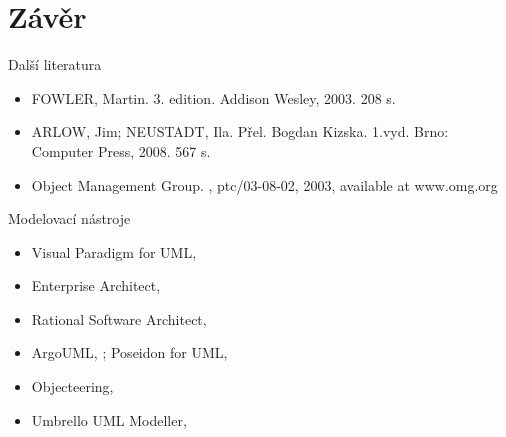 \section{Závěr}



\begin{frame}{Další literatura}

\begin{itemize}
	\item \alert{FOWLER}, Martin.  3. edition.
	Addison Wesley, 2003. 208 s.
	
	\item \alert{ARLOW}, Jim; \alert{NEUSTADT}, Ila.  Přel. 
	Bogdan Kizska. 1.vyd. Brno: Computer Press, 2008. 567 s.
	
	\item \alert{Object Management Group}. , ptc/03-08-02, 2003,
	available at www.omg.org
\end{itemize}

\end{frame}


\begin{frame}{Modelovací nástroje}

\begin{itemize}
	\item Visual Paradigm for UML, 
	\item Enterprise Architect, 
	\item Rational Software Architect, 
	\item ArgoUML, ; Poseidon for UML, 
	\item Objecteering, 
	\item Umbrello UML Modeller, 
\end{itemize}

\end{frame}

